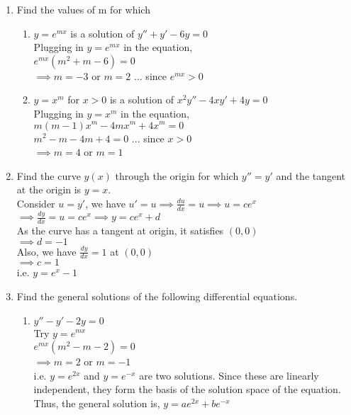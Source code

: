 \documentclass[a4paper]{article}
\begin{document}
\begin{enumerate}
	\item Find the values of m for which
	\begin{enumerate}
		\item $y=e^{mx}$ is a solution of $y''+y'-6y=0$
			\\Plugging in $y=e^{mx}$ in the equation,
			\\$e^{mx}(m^2+m-6)=0$
			\\$\implies m=-3$ or $m=2$ \hfill ... since $e^{mx}>0$
		\item $y=x^m$ for $x>0$ is a solution of $x^2y''-4xy'+4y=0$
			\\Plugging in $y=x^m$ in the equation,
			\\$m(m-1)x^m-4mx^m+4x^m=0$
			\\$m^2-m-4m+4=0$ \hfill ... since $x>0$
			\\$\implies m=4$ or $m=1$
	\end{enumerate}
	
	\item Find the curve $y(x)$ through the origin for which $y''=y'$ and the tangent at the origin is $y=x$.
	\\Consider $u=y'$, we have $u'=u \implies \frac{du}{dx}=u \implies u=ce^x$
	\\$\implies \frac{dy}{dx}=u=ce^x \implies y=ce^x + d$
	\\As the curve has a tangent at origin, it satisfies $(0,0)$
	\\$\implies d=-1$
	\\Also, we have $\frac{dy}{dx}=1$ at $(0,0)$
	\\$\implies c=1$
	\\i.e. $y=e^x-1$
	
	\item Find the general solutions of the following differential equations.
	\begin{enumerate}
		\item $y''-y'-2y=0$
			\\Try $y=e^{mx}$
			\\$e^{mx}(m^2-m-2)=0$
			\\$\implies m=2$ or $m=-1$
			\\i.e. $y=e^{2x}$ and $y=e^{-x}$ are two solutions. Since these are linearly independent, they form the basis of the solution space of the equation. Thus, the general solution is,
			$y=ae^{2x}+be^{-x}$
		

\end{enumerate}
\end{enumerate}
\end{document}
